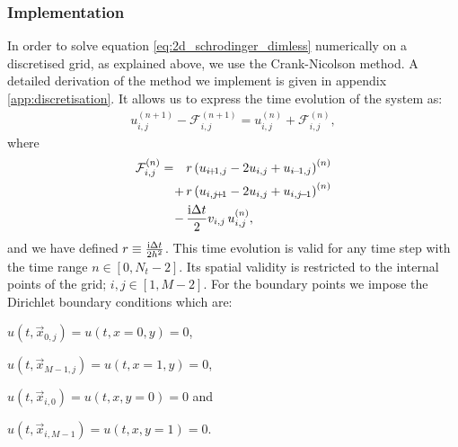     \subsubsection{Implementation}\label{sec:methods:numerical_scheme:implementation}
        In order to solve equation \eqref{eq:2d_schrodinger_dimless} numerically on a discretised grid, as explained above, we use the Crank-Nicolson method. A detailed derivation of the method we implement is given in appendix \ref{app:discretisation}. It allows us to express the time evolution of the system as:
        \begin{align}\label{eq:equation_to_solve_non-matrix}
            u_{i,j}^{(n+1)} - \mathcal{F}_{i,j}^{(n+1)} = u_{i, j}^{(n)} + \mathcal{F}_{i,j}^{(n)},
        \end{align}
        where
        \begin{equation}
            \begin{split}
            \mathcal{F}_{i,j}^{(n)} = \quad&r\closed{ u_{i\!+\!1, j}-2u_{i,j} + u_{i\!-\!1, j}}^{(n)}  \\
            +\,&  r\closed{u_{i,j\!+\!1}-2u_{i,j} + u_{i,j\!-\!1}}^{(n)}\\ 
            -\,& \frac{\im \Delta t}{2} v_{i,j}\,u_{i,j}^{(n)},
            \end{split}
        \end{equation}
        and we have defined $r\equiv \frac{\mathrm{i}\Delta t}{2h^2}$. This time evolution is valid for any time step with the time range $n\in[0,N_t-2]$. Its spatial validity is restricted to the internal points of the grid; $i,j\in[1,M-2]$. For the boundary points we impose the Dirichlet boundary conditions which are:
        \begin{itemize*}
            \item[] $u(t, \vec{x}_{0,j})       = u(t, x\!=\!0, y) = 0$, \\
            \item[] $u(t, \vec{x}_{M\!-\!1,j}) = u(t, x\!=\!1, y) = 0$, \\
            \item[] $u(t, \vec{x}_{i,0})       = u(t, x, y\!=\!0) = 0$ and \\
            \item[] $u(t, \vec{x}_{i,M\!-\!1}) = u(t, x, y\!=\!1) = 0$.
        \end{itemize*}  

